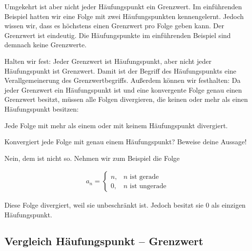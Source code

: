\documentclass[fontsize=9pt,
               parskip=half-,
               DIV=14,
               listof=chapterentry,
               tocflat]{scrbook}
\begin{document}
Umgekehrt ist aber nicht jeder Häufungspunkt ein Grenzwert. Im einführenden Beispiel hatten wir eine Folge mit zwei Häufungspunkten kennengelernt. Jedoch wissen wir, dass es höchstens einen Grenzwert pro Folge geben kann. Der Grenzwert ist eindeutig. Die Häufungspunkte im einführenden Beispiel sind demnach keine Grenzwerte.

Halten wir fest: Jeder Grenzwert ist Häufungspunkt, aber nicht jeder Häufungspunkt ist Grenzwert. Damit ist der Begriff des Häufungspunkts eine Verallgemeinerung des Grenzwertbegriffs. Außerdem können wir festhalten: Da jeder Grenzwert ein Häufungspunkt ist und eine konvergente Folge genau einen Grenzwert besitzt, müssen alle Folgen divergieren, die keinen oder mehr als einen Häufungspunkt besitzen:

\begin{theorem*}
Jede Folge mit mehr als einem oder mit keinem Häufungspunkt divergiert.

\end{theorem*}

\begin{mdframed}[style=semanticbox,frametitleaboveskip=3pt,innerbottommargin=3pt,frametitle=Frage]
Konvergiert jede Folge mit genau einem Häufungspunkt? Beweise deine Aussage!

\end{mdframed}

\begin{answer*}
Nein, dem ist nicht so. Nehmen wir zum Beispiel die Folge

\begin{align*}
a_{n}={\begin{cases}n,&n{\text{ ist gerade}}\\0,&n{\text{ ist ungerade}}\end{cases}}
\end{align*}

Diese Folge divergiert, weil sie unbeschränkt ist. Jedoch besitzt sie 0 als einzigen Häufungspunkt.

\end{answer*}

\pagebreak
\subsection{Vergleich Häufungspunkt – Grenzwert}
\renewcommand{\arraystretch}{1.5}
\end{document}
